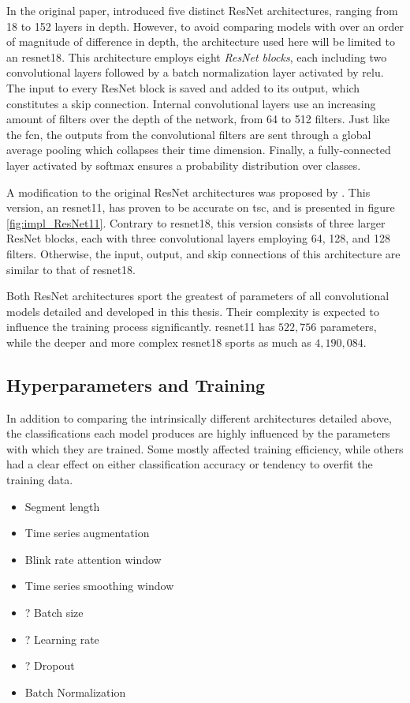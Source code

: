 In the original paper, \textcite{he2015} introduced five distinct ResNet architectures, ranging from 18 to 152 layers in depth. However, to avoid comparing models with over an order of magnitude of difference in depth, the architecture used here will be limited to an \acrfull{resnet18}. This architecture employs eight \textit{ResNet blocks}, each including two convolutional layers followed by a batch normalization layer activated by \acrshort{relu}. The input to every ResNet block is saved and added to its output, which constitutes a skip connection. Internal convolutional layers use an increasing amount of filters over the depth of the network, from 64 to 512 filters. Just like the \acrshort{fcn}, the outputs from the convolutional filters are sent through a global average pooling which collapses their time dimension. Finally, a fully-connected layer activated by softmax ensures a probability distribution over classes.

A modification to the original ResNet architectures was proposed by \textcite{wang2016}. This version, an \acrfull{resnet11}, has proven to be accurate on \acrshort{tsc}, and is presented in figure \ref{fig:impl_ResNet11}. Contrary to \acrshort{resnet18}, this version consists of three larger ResNet blocks, each with three convolutional layers employing 64, 128, and 128 filters. Otherwise, the input, output, and skip connections of this architecture are similar to that of \acrshort{resnet18}.

Both ResNet architectures sport the greatest of parameters of all convolutional models detailed and developed in this thesis. Their complexity is expected to influence the training process significantly. \acrshort{resnet11} has $522,756$ parameters, while the deeper and more complex \acrshort{resnet18} sports as much as $4,190,084$. 


\newpage
\subsection{Hyperparameters and Training}

In addition to comparing the intrinsically different architectures detailed above, the classifications each model produces are highly influenced by the parameters with which they are trained. Some mostly affected training efficiency, while others had a clear effect on either classification accuracy or tendency to overfit the training data.

\begin{itemize}
    \item Segment length
    \item Time series augmentation
    \item Blink rate attention window
    \item Time series smoothing window
    \item ? Batch size
    \item ? Learning rate
    \item ? Dropout
    \item Batch Normalization
\end{itemize}